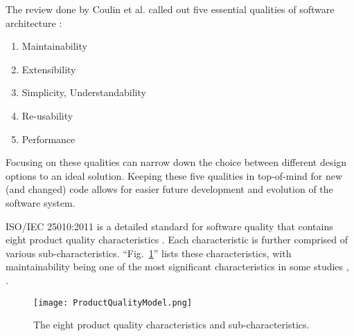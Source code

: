 The review done by Coulin et al. called out five essential qualities of software architecture \cite{coulin:2019}:

\vspace{0.25cm}
\begin{enumerate}
    \item Maintainability
    \item Extensibility
    \item Simplicity, Understandability
    \item Re-usability
    \item Performance
\end{enumerate}
\vspace{0.25cm}

Focusing on these qualities can narrow down the choice between different design options to an ideal solution. Keeping these five qualities in top-of-mind for new (and changed) code allows for easier future development and evolution of the software system.

ISO/IEC 25010:2011 is a detailed standard for software quality that contains eight product quality characteristics  \cite{iso/iec:25010:2011}. Each characteristic is further comprised of various sub-characteristics. ``Fig.~\ref{figProductQualityModel}'' lists these characteristics, with maintainability being one of the most significant characteristics in some studies \cite{gupta:2021}, \cite{adewumi:2016}.

\begin{figure}[ht]
  \centerline{
    \texttt{[image: ProductQualityModel.png]}
  }
  \caption{The eight product quality characteristics and sub-characteristics.}
  \label{figProductQualityModel}
\end{figure}
